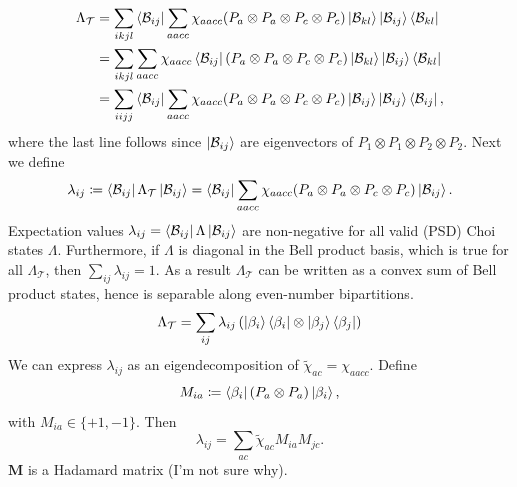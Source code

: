 \documentclass{article}
\begin{document}
\begin{equation}
    \begin{split}
    \Lambda_\mathcal{T} &= \sum_{ikjl} \bra{\mathcal{B}_{ij}} \sum_{aacc}\chi_{aacc} (P_a\otimes P_a \otimes P_c\otimes P_c) \ket{\mathcal{B}_{kl}} \ket{\mathcal{B}_{ij}}\bra{\mathcal{B}_{kl}} \\
    &= \sum_{ikjl} \sum_{aacc}\chi_{aacc} \bra{\mathcal{B}_{ij}} (P_a\otimes P_a \otimes P_c\otimes P_c) \ket{\mathcal{B}_{kl}} \ket{\mathcal{B}_{ij}}\bra{\mathcal{B}_{kl}} \\ 
    &= \sum_{iijj} \bra{\mathcal{B}_{ij}} \sum_{aacc}\chi_{aacc}(P_a\otimes P_a \otimes P_c\otimes P_c) \ket{\mathcal{B}_{ij}} \ket{\mathcal{B}_{ij}}\bra{\mathcal{B}_{ij}},
    \end{split}
\end{equation}
where the last line follows since $\ket{\mathcal{B}_{ij}}$ are eigenvectors of $P_1\otimes P_1 \otimes P_2 \otimes P_2$. Next we define 
\begin{equation}
    \lambda_{ij} \coloneq \bra{\mathcal{B}_{ij}} \Lambda_\mathcal{T} \ket{\mathcal{B}_{ij}} = \bra{\mathcal{B}_{ij}} \sum_{aacc}\chi_{aacc}(P_a\otimes P_a \otimes P_c\otimes P_c) \ket{\mathcal{B}_{ij}}.
\end{equation}
Expectation values $\lambda_{ij} = \bra{\mathcal{B}_{ij}} \Lambda \ket{\mathcal{B}_{ij}}$ are non-negative for all valid (PSD) Choi states $\Lambda$. Furthermore, if $\Lambda$ is diagonal in the Bell product basis, which is true for all $\Lambda_\mathcal{T}$, then $\sum_{ij}\lambda_{ij} = 1$. As a result $\Lambda_\mathcal{T}$ can be written as a convex sum of Bell product states, hence is separable along even-number bipartitions.
\begin{equation}
    \Lambda_\mathcal{T} = \sum_{ij}\lambda_{ij} \left(\ket{\beta_i}\bra{\beta_i}\otimes \ket{\beta_j}\bra{\beta_j}\right)
\end{equation}
We can express $\lambda_{ij}$ as an eigendecomposition of $\tilde{\chi}_{ac} = \chi_{aacc}$. Define
\begin{equation}
    M_{ia} \coloneq \bra{\beta_i}(P_a\otimes P_a) \ket{\beta_i},
\end{equation}
with $M_{ia} \in \{+1, -1\}$. 
Then
\begin{equation}
    \lambda_{ij} = \sum_{ac} \tilde{\chi}_{ac}M_{ia}M_{jc}.
\end{equation}
$\bm{M}$ is a Hadamard matrix (I'm not sure why).
\end{document}
